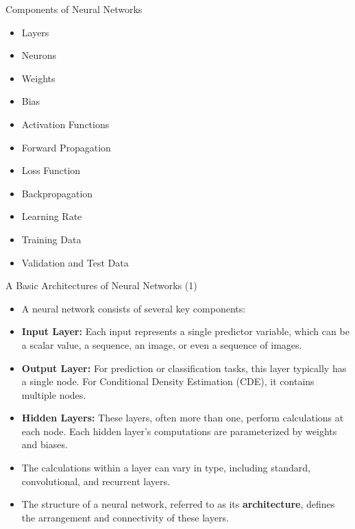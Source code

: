 \documentclass[10pt, hyperref={colorlinks = true,linkcolor = blue}]{beamer}
\begin{document}
{{\begin{frame}{Components of Neural Networks}
\begin{itemize}
    \item Layers
     \item Neurons
    \item Weights
    \item Bias
    \item Activation Functions
    \item Forward Propagation
    \item Loss Function
    \item Backpropagation
    \item Learning Rate
    \item Training Data
    \item Validation and Test Data
\end{itemize}
\end{frame}


\begin{frame}{A Basic Architectures of Neural Networks (1)}
    \begin{itemize}
        \item A neural network consists of several key components:
        \item \textbf{Input Layer:} Each input represents a single predictor variable, which can be a scalar value, a sequence, an image, or even a sequence of images.
        \item \textbf{Output Layer:} For prediction or classification tasks, this layer typically has a single node. For Conditional Density Estimation (CDE), it contains multiple nodes.
        \item \textbf{Hidden Layers:} These layers, often more than one, perform calculations at each node. Each hidden layer's computations are parameterized by weights and biases.
        \item The calculations within a layer can vary in type, including standard, convolutional, and recurrent layers.
        \item The structure of a neural network, referred to as its \textbf{architecture}, defines the arrangement and connectivity of these layers.
    \end{itemize}
\end{frame}

}}
\end{document}
